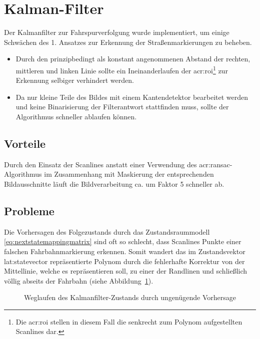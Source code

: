 \section{Kalman-Filter \dcsecondauthorshort}

Der Kalmanfilter zur Fahrspurverfolgung wurde implementiert, um einige Schwächen des 1. Ansatzes zur Erkennung der Straßenmarkierungen zu beheben.
\begin{itemize}
\item Durch den prinzipbedingt als konstant angenommenen Abstand der rechten, mittleren und linken Linie sollte ein \glqq Ineinanderlaufen\grqq{} der \gls{acr:roi}\footnote{Die \gls{acr:roi} stellen in diesem Fall die senkrecht zum Polynom aufgestellten Scanlines dar.} zur Erkennung selbiger verhindert werden.
\item Da nur kleine Teile des Bildes mit einem Kantendetektor bearbeitet werden und keine Binarisierung der Filterantwort stattfinden muss, sollte der Algorithmus schneller ablaufen können.
\end{itemize}

\subsection{Vorteile}
Durch den Einsatz der Scanlines anstatt einer Verwendung des \gls{acr:ransac}-Algorithmus im Zusammenhang mit Maskierung der entsprechenden Bildausschnitte läuft die Bildverarbeitung ca. um Faktor 5 schneller ab.

\subsection{Probleme}
Die Vorhersagen des Folgezustands durch das Zustandsraummodell \eqref{eq:nextstatemappingmatrix} sind oft so schlecht, dass Scanlines Punkte einer falschen Fahrbahnmarkierung erkennen. Somit \glqq wandert\grqq{} das im Zustandsvektor \gls{lat:statevector} repräsentierte Polynom durch die fehlerhafte Korrektur von der Mittellinie, welche es repräsentieren soll, zu einer der Randlinen und schließlich völlig abseits der Fahrbahn (siehe Abbildung~\ref{fig:evaluation:kalman:weggezogen}).

\begin{figure}[htbp] %
	\centering
	\quad
	\quad
	\quad
	\quad
	\caption{\glqq Weglaufen \grqq des Kalmanfilter-Zustands durch ungenügende Vorhersage}
	\label{fig:evaluation:kalman:weggezogen}
\end{figure}

